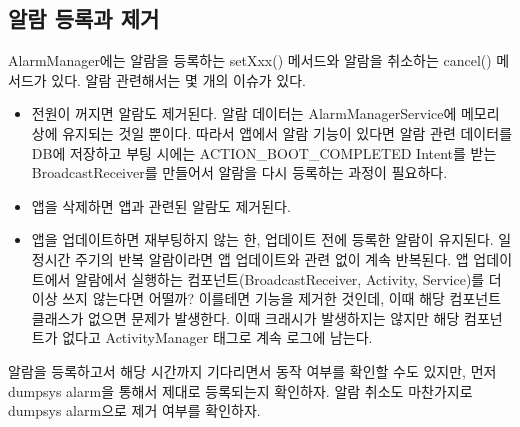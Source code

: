 \subsection{알람 등록과 제거}
AlarmManager에는 알람을 등록하는 setXxx() 메서드와 알람을 취소하는 cancel() 메서드가 있다. 알람 관련해서는 몇 개의 이슈가 있다.

\begin{itemize}
\item 전원이 꺼지면 알람도 제거된다. 알람 데이터는 AlarmManagerService에 메모리 상에 유지되는 것일 뿐이다. 따라서 앱에서 알람 기능이 있다면 알람 관련 데이터를 DB에 저장하고 부팅 시에는 ACTION\_BOOT\_COMPLETED Intent를 받는 BroadcastReceiver를 만들어서 알람을 다시 등록하는 과정이 필요하다.

\item 앱을 삭제하면 앱과 관련된 알람도 제거된다.

\item 앱을 업데이트하면 재부팅하지 않는 한, 업데이트 전에 등록한 알람이 유지된다. 일정시간 주기의 반복 알람이라면 앱 업데이트와 관련 없이 계속 반복된다. 앱 업데이트에서 알람에서 실행하는 컴포넌트(BroadcastReceiver, Activity, Service)를 더 이상 쓰지 않는다면 어떨까? 이를테면 기능을 제거한 것인데, 이때 해당 컴포넌트 클래스가 없으면 문제가 발생한다. 이때 크래시가 발생하지는 않지만 해당 컴포넌트가 없다고 ActivityManager 태그로 계속 로그에 남는다.
\end{itemize}

알람을 등록하고서 해당 시간까지 기다리면서 동작 여부를 확인할 수도 있지만, 먼저 dumpsys alarm을 통해서 제대로 등록되는지 확인하자. 알람 취소도 마찬가지로 dumpsys alarm으로 제거 여부를 확인하자.



